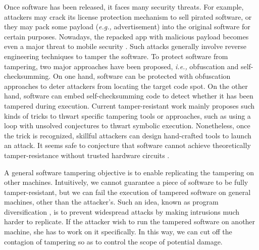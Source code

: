 \documentclass[10pt, conference]{IEEEtran}
\begin{document}
Once software has been released, it faces many security threats.  For example, attackers may crack its license protection mechanism to sell pirated software, or they may pack some payload (\textit{e.g.,} advertisement) into the original software for certain purposes.  Nowadays, the repacked app with malicious payload becomes even a major threat to mobile security \cite{zhou2012dissecting}.  Such attacks generally involve reverse engineering techniques to tamper the software.  To protect software from tampering, two major approaches have been proposed, \textit{i.e.,} obfuscation and self-checksumming.  On one hand, software can be protected with obfuscation approaches to deter attackers from locating the target code spot.  On the other hand, software can embed self-checksumming code to detect whether it has been tampered during execution.  Current tamper-resistant work mainly proposes such kinds of tricks to thwart specific tampering tools or approaches, such as using a loop with unsolved conjectures to thwart symbolic execution.  Nonetheless, once the trick is recognized, skillful attackers can design hand-crafted tools to launch an attack.  It seems safe to conjecture that software cannot achieve theoretically tamper-resistance without trusted hardware circuits \cite{chen2003oblivious}.

A general software tampering objective is to enable replicating the tampering on other machines.  Intuitively, we cannot guarantee a piece of software to be fully tamper-resistant, but we can fail the execution of tampered software on general machines, other than the attacker's.  Such an idea, known as program diversification \cite{forrest1997building}, is to prevent widespread attacks by making intrusions much harder to replicate.  If the attacker wish to run the tampered software on another machine, she has to work on it specifically.  In this way, we can cut off the contagion of tampering so as to control the scope of potential damage.
\end{document}
